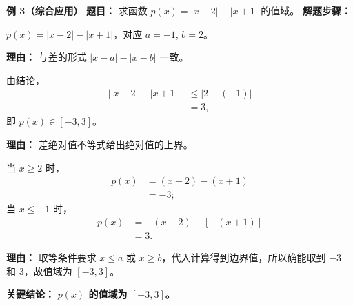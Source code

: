 \begin{examplebox}
	\medskip
	\textbf{\textcolor{CExample}{例 3（综合应用）}}
	\textbf{\textcolor{CExample}{题目：}}
	求函数 $p(x)=|x-2|-|x+1|$ 的值域。
	\textbf{\textcolor{CExample}{解题步骤：}}
	\begin{description}[style=nextline, leftmargin=2.8em, labelsep=0.5em, itemsep=0.45em]
		\item[\textbf{第一步（识别结构）：}]
			$p(x)=|x-2|-|x+1|$，对应 $a=-1$, $b=2$。
			\par\textbf{理由：} 与差的形式 $|x-a|-|x-b|$ 一致。
		\item[\textbf{第二步（应用差不等式）：}]
			由结论，
			\[
				\begin{aligned}
					\bigl| |x-2|-|x+1| \bigr| &\le |2-(-1)| \\ &= 3,
			\end{aligned}
			\]
			即 $p(x) \in [-3,3]$。
			\par\textbf{理由：} 差绝对值不等式给出绝对值的上界。
		\item[\textbf{第三步（验证等号可行）：}]
			当 $x\ge 2$ 时，
			\[
				\begin{aligned}
					p(x) &= (x-2)-(x+1) \\ &= -3;
			\end{aligned}
			\]
			当 $x\le -1$ 时，
			\[
				\begin{aligned}
					p(x) &= -(x-2)-[-(x+1)] \\ &= 3.
			\end{aligned}
			\]
			\par\textbf{理由：} 取等条件要求 $x\le a$ 或 $x\ge b$，代入计算得到边界值，所以确能取到 $-3$ 和 $3$，故值域为 $[-3,3]$。
	\end{description}
	\textbf{\textcolor{CExample}{关键结论：}}
	\textbf{$p(x)$ 的值域为 $[-3,3]$。}
\end{examplebox}

